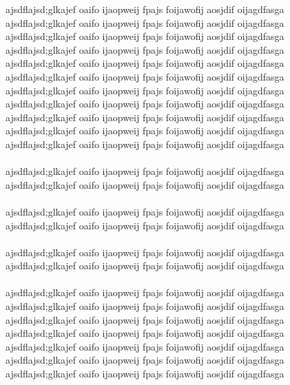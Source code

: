 \documentclass[twoside,a4paper,twocolumn,landscape]{PhanRaw}
\begin{document}
\pagestyle{fancy}
ajsdflajsd;glkajef oaifo ijaopweij fpajs foijawofij aosjdif oijagdfasga
ajsdflajsd;glkajef oaifo ijaopweij fpajs foijawofij aosjdif oijagdfasga\\
ajsdflajsd;glkajef oaifo ijaopweij fpajs foijawofij aosjdif oijagdfasga
ajsdflajsd;glkajef oaifo ijaopweij fpajs foijawofij aosjdif oijagdfasga
\\
ajsdflajsd;glkajef oaifo ijaopweij fpajs foijawofij aosjdif oijagdfasga\\
ajsdflajsd;glkajef oaifo ijaopweij fpajs foijawofij aosjdif oijagdfasga
\\
ajsdflajsd;glkajef oaifo ijaopweij fpajs foijawofij aosjdif oijagdfasga\\
ajsdflajsd;glkajef oaifo ijaopweij fpajs foijawofij aosjdif oijagdfasga
\\
ajsdflajsd;glkajef oaifo ijaopweij fpajs foijawofij aosjdif oijagdfasga\\
ajsdflajsd;glkajef oaifo ijaopweij fpajs foijawofij aosjdif oijagdfasga
ajsdflajsd;glkajef oaifo ijaopweij fpajs foijawofij aosjdif oijagdfasga\\
\\
ajsdflajsd;glkajef oaifo ijaopweij fpajs foijawofij aosjdif oijagdfasga
ajsdflajsd;glkajef oaifo ijaopweij fpajs foijawofij aosjdif oijagdfasga\\
\\
ajsdflajsd;glkajef oaifo ijaopweij fpajs foijawofij aosjdif oijagdfasga
ajsdflajsd;glkajef oaifo ijaopweij fpajs foijawofij aosjdif oijagdfasga\\
\\
ajsdflajsd;glkajef oaifo ijaopweij fpajs foijawofij aosjdif oijagdfasga
ajsdflajsd;glkajef oaifo ijaopweij fpajs foijawofij aosjdif oijagdfasga\\
\\
ajsdflajsd;glkajef oaifo ijaopweij fpajs foijawofij aosjdif oijagdfasga
\\
ajsdflajsd;glkajef oaifo ijaopweij fpajs foijawofij aosjdif oijagdfasga\\
ajsdflajsd;glkajef oaifo ijaopweij fpajs foijawofij aosjdif oijagdfasga
\\
ajsdflajsd;glkajef oaifo ijaopweij fpajs foijawofij aosjdif oijagdfasga\\
ajsdflajsd;glkajef oaifo ijaopweij fpajs foijawofij aosjdif oijagdfasga
\\
ajsdflajsd;glkajef oaifo ijaopweij fpajs foijawofij aosjdif oijagdfasga
ajsdflajsd;glkajef oaifo ijaopweij fpajs foijawofij aosjdif oijagdfasga\\
\end{document}
